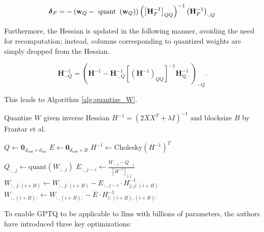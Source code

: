 \begin{equation}
    \boldsymbol{\delta}_F = -\left(\mathbf{w}_Q-\text { quant }\left(\mathbf{w}_Q\right)\right)\left(\left[\mathbf{H}_F^{-1}\right]_{Q Q}\right)^{-1}\left(\mathbf{H}_F^{-1}\right)_{:, Q} \\
    \label{eq:weight_update}
\end{equation}

Furthermore, the Hessian is updated in the following manner, avoiding the need for recomputation; instead, columns corresponding to quantized weights are simply dropped from the Hessian.

\begin{equation}
    \mathbf{H}_{-Q}^{-1} = \left(\mathbf{H}^{-1} - \mathbf{H}_{:, Q}^{-1}\left[\left(\mathbf{H}^{-1}\right)_{Q Q}\right]^{-1} \mathbf{H}_{Q,:}^{-1}\right)_{-Q}.
    \label{eq:hessian_upadte}
\end{equation}

This leads to Algorithm \ref{alg:quantize_W}.

\begin{algorithm}
    \caption{Quantize $W$ given inverse Hessian $H^{-1} = (2XX^T + \lambda I)^{-1}$ and blocksize $B$ by Frantar et al. \cite{frantar_gptq_2023}}
    \label{alg:quantize_W}
    \begin{algorithmic}[1]
    \State $Q \gets \mathbf{0}_{d_{\text{row}} \times d_{\text{col}}}$ 
    \State $E \gets \mathbf{0}_{d_{\text{row}} \times B}$ 
    \State $H^{-1} \gets \text{Cholesky}(H^{-1})^T$ 
    
            \State $Q_{:,\,j} \gets \text{quant}(W_{:,\,j})$ 
            \State $E_{:,\,j-i} \gets \frac{W_{:,\,j} - Q_{:,\,j}}{[H^{-1}]_{j,j}}$ 
            \State $W_{:,\,j:(i+B)} \gets W_{:,\,j:(i+B)} - E_{:,\,j-i} \cdot H^{-1}_{j,j:(i+B)}$ 
        \EndFor
        \State $W_{:,(i+B):} \gets W_{:,(i+B):} - E \cdot H^{-1}_{i:(i+B),(i+B):}$ 
    \EndFor
    \end{algorithmic}
\end{algorithm}

To enable GPTQ to be applicable to \gls{llm}s with billions of parameters, the authors have introduced three key optimizations:

